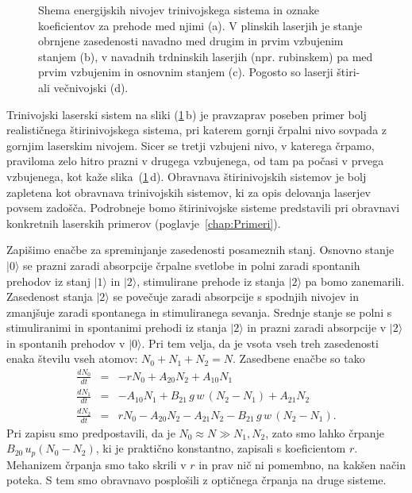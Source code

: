 \begin{figure}[h]
\centering
\def\svgwidth{100truemm} 

\caption{Shema energijskih nivojev trinivojskega sistema in oznake koeficientov za prehode
med njimi (a). 
V plinskih laserjih je stanje obrnjene zasedenosti navadno med drugim in prvim
vzbujenim stanjem (b), v navadnih trdninskih laserjih (npr. rubinskem) pa med 
prvim vzbujenim in osnovnim stanjem (c). Pogosto so laserji štiri- ali večnivojski (d).}
\label{fig:3nivojski}
\end{figure}
\begin{remark}
Trinivojski laserski sistem na sliki (\ref{fig:3nivojski}\,b) je pravzaprav 
poseben primer bolj realističnega štirinivojskega sistema, 
pri katerem gornji črpalni nivo sovpada z gornjim laserskim nivojem. Sicer se tretji vzbujeni nivo, 
v katerega črpamo, praviloma zelo hitro prazni v drugega vzbujenega, od tam pa počasi v prvega vzbujenega, 
kot kaže slika~(\ref{fig:3nivojski}\,d).
Obravnava štirinivojskih sistemov je bolj zapletena kot obravnava trinivojskih sistemov, 
ki za opis delovanja laserjev povsem zadošča. Podrobneje bomo štirinivojske sisteme 
predstavili pri obravnavi konkretnih laserskih primerov (poglavje~\ref{chap:Primeri}).
\end{remark}

Zapišimo enačbe za spreminjanje zasedenosti posameznih stanj. Osnovno stanje
$|0\rangle$ se prazni zaradi absorpcije črpalne svetlobe in polni zaradi
spontanih prehodov iz stanj $|1\rangle$ in $|2\rangle$, stimulirane
prehode iz stanja $|2\rangle$ pa bomo zanemarili. Zasedenost stanja $|2\rangle$ se
povečuje zaradi absorpcije s spodnjih nivojev in zmanjšuje
zaradi spontanega in stimuliranega sevanja. Srednje stanje se polni
s stimuliranimi in spontanimi prehodi iz stanja $|2\rangle$ in prazni
zaradi absorpcije v $|2\rangle$ in spontanih prehodov v $|0\rangle$.
Pri tem velja, da je vsota vseh treh zasedenosti enaka številu vseh atomov: $N_{0}+N_{1}+N_{2}=N$. 
Zasedbene enačbe so tako
\begin{eqnarray}
\frac{dN_{0}}{dt} & = & -rN_0+A_{20}N_{2}+A_{10}N_{1} \label{4.39.1}\\
\frac{dN_{1}}{dt} & = & -A_{10}N_{1}+B_{21}\,g\,w\, (N_{2}-N_{1})+A_{21}N_{2} \label{4.39.2}\\
\frac{dN_{2}}{dt} & = & rN_0-A_{20}N_{2}-A_{21}N_{2}-B_{21}\,g\,w\, (N_2-N_1).
\label{4.39}
\end{eqnarray}
Pri zapisu smo predpostavili, da je $N_0 \approx N \gg N_1, N_2$, zato smo lahko črpanje $B_{20}\, 
u_{p} (N_0-N_2)$, ki je praktično konstantno, zapisali s koeficientom $r$. Mehanizem črpanja 
smo tako skrili v $r$ in prav nič ni pomembno, na kakšen način poteka.
S tem smo obravnavo posplošili z optičnega črpanja na druge sisteme. 

